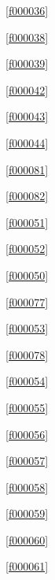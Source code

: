 \noindent\filesourcenumbernameone\ \ref{f000036}\dotfill\pageref{f000036}%

\noindent\filesourcenumbernameone\ \ref{f000038}\dotfill\pageref{f000038}%

\noindent\filesourcenumbernameone\ \ref{f000039}\dotfill\pageref{f000039}%

\noindent\filesourcenumbernameone\ \ref{f000042}\dotfill\pageref{f000042}%

\noindent\filesourcenumbernameone\ \ref{f000043}\dotfill\pageref{f000043}%

\noindent\filesourcenumbernameone\ \ref{f000044}\dotfill\pageref{f000044}%

\noindent\filesourcenumbernameone\ \ref{f000081}\dotfill\pageref{f000081}%

\noindent\filesourcenumbernameone\ \ref{f000082}\dotfill\pageref{f000082}%

\noindent\filesourcenumbernameone\ \ref{f000051}\dotfill\pageref{f000051}%

\noindent\filesourcenumbernameone\ \ref{f000052}\dotfill\pageref{f000052}%

\noindent\filesourcenumbernameone\ \ref{f000050}\dotfill\pageref{f000050}%

\noindent\filesourcenumbernameone\ \ref{f000077}\dotfill\pageref{f000077}%

\noindent\filesourcenumbernameone\ \ref{f000053}\dotfill\pageref{f000053}%

\noindent\filesourcenumbernameone\ \ref{f000078}\dotfill\pageref{f000078}%

\noindent\filesourcenumbernameone\ \ref{f000054}\dotfill\pageref{f000054}%

\noindent\filesourcenumbernameone\ \ref{f000055}\dotfill\pageref{f000055}%

\noindent\filesourcenumbernameone\ \ref{f000056}\dotfill\pageref{f000056}%

\noindent\filesourcenumbernameone\ \ref{f000057}\dotfill\pageref{f000057}%

\noindent\filesourcenumbernameone\ \ref{f000058}\dotfill\pageref{f000058}%

\noindent\filesourcenumbernameone\ \ref{f000059}\dotfill\pageref{f000059}%

\noindent\filesourcenumbernameone\ \ref{f000060}\dotfill\pageref{f000060}%

\noindent\filesourcenumbernameone\ \ref{f000061}\dotfill\pageref{f000061}%

